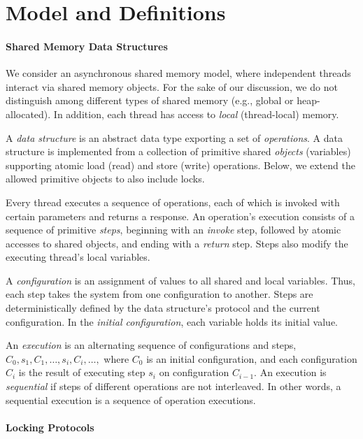 \section{Model and Definitions}\label{sec:model}


\paragraph{Shared Memory Data Structures}

We consider an asynchronous shared memory model, where independent threads interact via shared memory objects.
For the sake of our discussion, we do not distinguish among different types of shared memory (e.g., global or heap-allocated).
In addition, each thread has access to \emph{local} (thread-local) memory.

A \emph{data structure} is an abstract data type exporting a set of \emph{operations}.
A data structure is implemented from a collection of primitive shared \emph{objects} (variables) supporting atomic load (read) and store (write) operations.
Below, we extend the allowed primitive objects to also include locks.

Every thread executes a sequence of operations, each of which is invoked with certain parameters and returns a response.
An operation's execution consists of a sequence of primitive \emph{steps}, beginning with an \emph{invoke} step, followed by
atomic accesses to shared objects, and ending with a \emph{return} step. Steps also modify the executing thread's local variables.

A \emph{configuration} is an assignment of values to all shared and local variables. Thus, each step takes the system from one
configuration to another. Steps are deterministically defined by the data structure's protocol and the current configuration.
In the \emph{initial configuration}, each variable holds its initial value.

An \emph{execution} is an alternating sequence of configurations and steps,
$C_0,s_1,C_1, \ldots,s_i,C_i,\ldots,$
where $C_0$ is an initial configuration,
and each configuration $C_i$ is the result of
executing step $s_i$ on configuration $C_{i-1}$.
An execution is \emph{sequential} if steps of different operations are not interleaved.
In other words, a sequential execution is a sequence of operation executions.

\paragraph{Locking Protocols}


